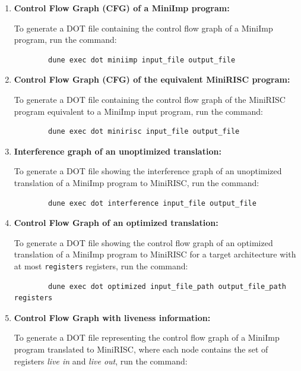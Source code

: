 \documentclass[a4paper,11pt]{report}
\begin{document}
\begin{enumerate}
	\item \label{HTU::Dot::impCfg} \textbf{Control Flow Graph (CFG) of a MiniImp program:}
	
	To generate a DOT file containing the control flow graph of a MiniImp program, run the command:
	
	\begin{verbatim}
		dune exec dot miniimp input_file output_file
	\end{verbatim}
	
	\item \textbf{Control Flow Graph (CFG) of the equivalent MiniRISC program:}
	
	To generate a DOT file containing the control flow graph of the MiniRISC program equivalent to a MiniImp input program, run the command:
	
	\begin{verbatim}
		dune exec dot minirisc input_file output_file
	\end{verbatim}
	
	\item \textbf{Interference graph of an unoptimized translation:}
	
	To generate a DOT file showing the interference graph of an unoptimized translation of a MiniImp program to MiniRISC, run the command:
	
	\begin{verbatim}
		dune exec dot interference input_file output_file
	\end{verbatim}
	
	\item \textbf{Control Flow Graph of an optimized translation:}
	
	To generate a DOT file showing the control flow graph of an optimized translation of a MiniImp program to MiniRISC for a target architecture with at most \texttt{registers} registers, run the command:
	
	\begin{verbatim}
		dune exec dot optimized input_file_path output_file_path registers
	\end{verbatim}
	
	\item \textbf{Control Flow Graph with liveness information:}
	
	To generate a DOT file representing the control flow graph of a MiniImp program translated to MiniRISC, where each node contains the set of registers \textit{live in} and \textit{live out}, run the command:
	

\end{enumerate}
\end{document}
